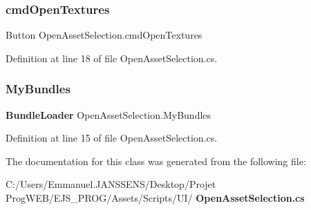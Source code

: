 \mbox{\label{class_open_asset_selection_a666b2c9e91f8fad70a55110537573102}} 
\subsubsection{cmd\+Open\+Textures}
{\footnotesize\ttfamily Button Open\+Asset\+Selection.\+cmd\+Open\+Textures}



Definition at line 18 of file Open\+Asset\+Selection.\+cs.

\mbox{\label{class_open_asset_selection_a3c2e6b1acc4ccf54af22fac3fae09038}} 
\subsubsection{My\+Bundles}
{\footnotesize\ttfamily \textbf{ Bundle\+Loader} Open\+Asset\+Selection.\+My\+Bundles}



Definition at line 15 of file Open\+Asset\+Selection.\+cs.



The documentation for this class was generated from the following file\+:\begin{DoxyCompactItemize}
\item 
C\+:/\+Users/\+Emmanuel.\+J\+A\+N\+S\+S\+E\+N\+S/\+Desktop/\+Projet Prog\+W\+E\+B/\+E\+J\+S\+\_\+\+P\+R\+O\+G/\+Assets/\+Scripts/\+U\+I/\textbf{ Open\+Asset\+Selection.\+cs}\end{DoxyCompactItemize}
